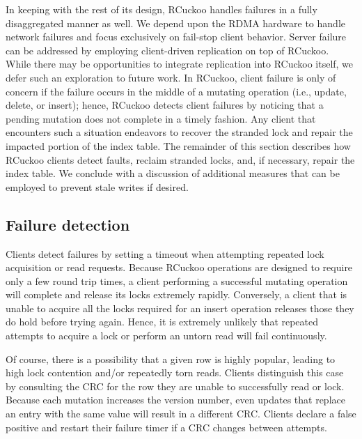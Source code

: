 In keeping with the rest of its design, RCuckoo handles failures in a
fully disaggregated manner as well.  We depend upon the RDMA hardware
to handle network failures and focus exclusively on fail-stop client
behavior.  Server failure can be addressed by employing client-driven
replication on top of RCuckoo.  While there may be opportunities to
integrate replication into RCuckoo itself, we defer such an
exploration to future work.  In RCuckoo, client failure is only of
concern if the failure occurs in the middle of a mutating operation
(i.e., update, delete, or insert); hence, RCuckoo detects client
failures by noticing that a pending mutation does not complete in a
timely fashion.  Any client that encounters such a situation endeavors
to recover the stranded lock and repair the impacted portion of the
index table.
%
%
The remainder of this section describes how RCuckoo clients detect
faults, reclaim stranded locks, and, if necessary, repair the index
table.  We conclude with a discussion of additional measures that can
be employed to prevent stale writes if desired.


\subsection{Failure detection} 

Clients detect failures by setting a timeout when attempting repeated
lock acquisition or read requests.  Because RCuckoo operations are
designed to require only a few round trip times, a client performing a
successful mutating operation will complete and release its locks
extremely rapidly.  Conversely, a client that is unable to acquire all
the locks required for an insert operation releases those they do hold
before trying again.  Hence, it is extremely unlikely that repeated
attempts to acquire a lock or perform an untorn read will fail
continuously.

Of course, there is a possibility that a given row is highly popular,
leading to high lock contention and/or repeatedly torn reads.
Clients distinguish this case by consulting the CRC for the row they
are unable to successfully read or lock.  Because each mutation
increases the version number, even updates that replace an entry with
the same value will result in a different CRC.  Clients declare a
false positive and restart their failure timer if a CRC changes
between attempts.


